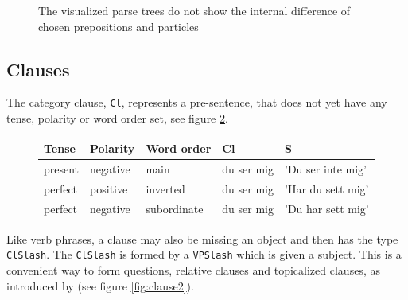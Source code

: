 \documentclass{report}
\begin{document}
\begin{figure}[h]
\hspace{10mm}
\caption{The visualized parse trees do not show the internal difference of chosen prepositions and particles}
\label{fig:translationtrees}
\end{figure}


\newpage
\subsection{Clauses}
The category clause, \verb-Cl-, represents a pre-sentence, that does not yet have any tense, polarity
or word order set, see figure \ref{fig:clause}.\\

\begin{figure}[h]
\begin{tabular}{|lll|ll|}
\hline
\textbf{Tense} &\textbf{Polarity} &\textbf{Word order} &\textbf{Cl} &\textbf{S} \\
\hline
present &negative & main        & du ser mig & 'Du ser inte mig'\\
perfect &positive & inverted    & du ser mig & 'Har du sett mig'\\
perfect &negative & subordinate & du ser mig & 'Du har sett mig'\\
\hline
\end{tabular}
\caption{}
\label{fig:clause}
\end{figure}


Like verb phrases, a clause may also be missing an object and then has the type
\verb-ClSlash-.
The \verb-ClSlash- is formed by a \verb-VPSlash- which is given a subject.
This is a convenient way to form questions, relative clauses
and topicalized clauses, as introduced by \cite{gazdar} (see figure \ref{fig:clause2}).\\
\end{document}
